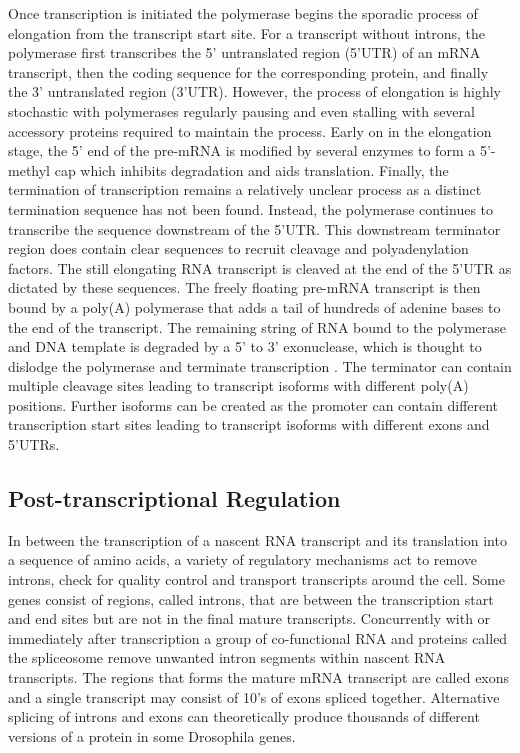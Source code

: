 \documentclass[../main.tex]{subfiles}
\begin{document}
Once transcription is initiated the polymerase begins the sporadic process of elongation from the transcript start site.
For a transcript without introns, the polymerase first transcribes the 5' untranslated region (5'UTR) of an mRNA transcript, then the coding sequence for the corresponding protein, and finally the 3' untranslated region (3'UTR).
However, the process of elongation is highly stochastic with polymerases regularly pausing and even stalling with several accessory proteins required to maintain the process.
Early on in the elongation stage, the 5' end of the pre-mRNA is modified by several enzymes to form a 5'-methyl cap which inhibits degradation and aids translation.
Finally, the termination of transcription remains a relatively unclear process as a distinct termination sequence has not been found.
Instead, the polymerase continues to transcribe the sequence downstream of the 5'UTR.
This downstream terminator region does contain clear sequences to recruit cleavage and polyadenylation factors. 
The still elongating RNA transcript is cleaved at the end of the 5'UTR as dictated by these sequences.
The freely floating pre-mRNA transcript is then bound by a poly(A) polymerase that adds a tail of hundreds of adenine bases to the end of the transcript.
The remaining string of RNA bound to the polymerase and DNA template is degraded by a 5' to 3' exonuclease, which is thought to dislodge the polymerase and terminate transcription \parencite{Alberts2017}.
The terminator can contain multiple cleavage sites leading to transcript isoforms with different poly(A) positions.
Further isoforms can be created as the promoter can contain different transcription start sites leading to transcript isoforms with different exons and 5'UTRs.


\subsection{Post-transcriptional Regulation}

In between the transcription of a nascent RNA transcript and its translation into a sequence of amino acids, a variety of regulatory mechanisms act to remove introns, check for quality control and transport transcripts around the cell.
Some genes consist of regions, called introns, that are between the transcription start and end sites but are not in the final mature transcripts.
Concurrently with or immediately after transcription a group of co-functional RNA and proteins called the spliceosome remove unwanted intron segments within nascent RNA transcripts.
The regions that forms the mature mRNA transcript are called exons and a single transcript may consist of 10's of exons spliced together.
Alternative splicing of introns and exons can theoretically produce thousands of different versions of a protein in some Drosophila genes.
\end{document}
